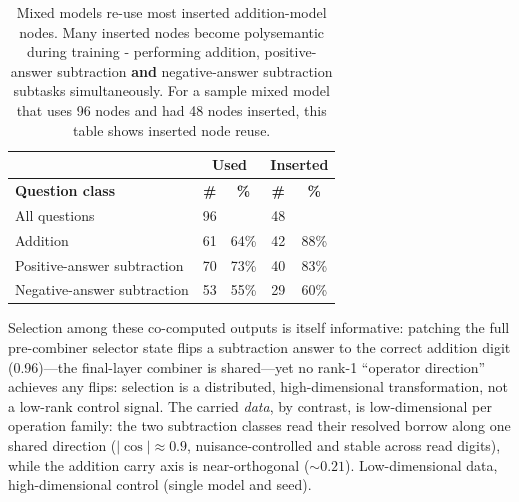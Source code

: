\documentclass[11pt]{article}
\begin{document}
\begin{table}[h]
    \caption{Mixed models re-use most inserted addition-model nodes. Many inserted nodes become polysemantic during training - performing addition, positive-answer subtraction \textbf{and} negative-answer subtraction subtasks simultaneously. For a sample mixed model that uses 96 nodes and had 48 nodes inserted, this table shows inserted node reuse.}    
    \label{tab:Coverage_SNM}
    \vspace{0.1in}
    \centering
    \begin{tabularx}{\columnwidth}{|X|c c|c c|}
        \hline
        & \multicolumn{2}{c|}{\textbf{Used}} & \multicolumn{2}{c|}{\textbf{Inserted}} \\
        \hline
        \textbf{Question class} & \textbf{\#} & \textbf{\%} & \textbf{\#} & \textbf{\%} \\
        \hline
        All questions & 96 & & 48 & \\
        Addition & 61 & 64\% & 42 & 88\% \\
        Positive-answer subtraction & 70 & 73\% & 40 & 83\% \\
        Negative-answer subtraction & 53 & 55\% & 29 & 60\% \\
        \hline
    \end{tabularx}
\end{table}

Selection among these co-computed outputs is itself informative: patching the full pre-combiner selector state flips a subtraction answer to the correct addition digit (0.96)---the final-layer combiner is shared---yet no rank-1 ``operator direction'' achieves any flips: selection is a distributed, high-dimensional transformation, not a low-rank control signal. The carried \emph{data}, by contrast, is low-dimensional per operation family: the two subtraction classes read their resolved borrow along one shared direction ($|\cos|\approx0.9$, nuisance-controlled and stable across read digits), while the addition carry axis is near-orthogonal (${\sim}0.21$). Low-dimensional data, high-dimensional control (single model and seed).
\end{document}
